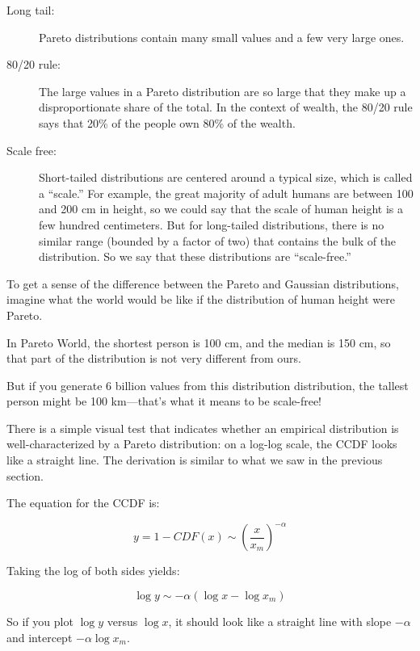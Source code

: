 \documentclass[10pt]{book}
\begin{document}
\begin{description}

\item[Long tail:] Pareto distributions contain many small values
and a few very large ones.  

\item[80/20 rule:] The large values in a Pareto distribution are
so large that they make up a disproportionate share of the total.
In the context of wealth, the 80/20 rule says that 20\% of the
people own 80\% of the wealth.

\item[Scale free:] Short-tailed distributions are centered around
a typical size, which is called a ``scale.''  For example, the
great majority of adult humans are between 100 and 200 cm in height,
so we could say that the scale of human height is a few hundred
centimeters.  But for long-tailed distributions, there is no
similar range (bounded by a factor of two) that contains the
bulk of the distribution.  So we say that these distributions
are ``scale-free.''

\end{description}

To get a sense of the difference between the Pareto and Gaussian
distributions, imagine what the world would be like if the
distribution of human height were Pareto.  

In Pareto World, the shortest person is 100 cm,
and the median is 150 cm, so that part of the distribution is not
very different from ours.

But if you generate 6 billion values from this distribution
distribution, the tallest person might
be 100 km---that's what it means to
be scale-free!

There is a simple visual test that indicates whether an empirical
distribution is well-characterized by a Pareto distribution: on a
log-log scale, the CCDF looks like a straight line.  The derivation is
similar to what we saw in the previous section.

The equation for the CCDF is:

\[ y = 1 - CDF(x) \sim \left( \frac{x}{x_m} \right) ^{-\alpha} \]

Taking the log of both sides yields:

\[ \log y \sim -\alpha (\log x - \log x_m ) \]

So if you plot $\log y$ versus $\log x$, it should look like a
straight line with slope $-\alpha$ and intercept $-\alpha \log x_m$.
\end{document}

